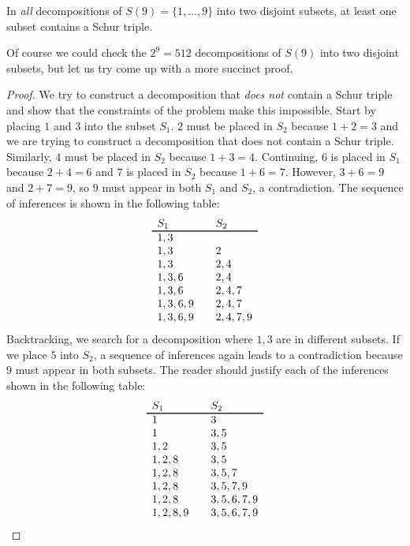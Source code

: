 \begin{theorem}
In \emph{all} decompositions of $S(9)=\{1,\ldots,9\}$ into two disjoint subsets, at least one subset contains a Schur triple.
\end{theorem}
Of course we could check the $2^9=512$ decompositions of $S(9)$ into two disjoint subsets, but let us try come up with a more succinct proof.
\begin{proof}
We try to construct a decomposition that \emph{does not} contain a Schur triple and show that the constraints of the problem make this impossible. Start by placing $1$ and $3$ into the subset $S_1$. $2$ must be placed in $S_2$ because $1+2=3$ and we are trying to construct a decomposition that does not contain a Schur triple. Similarly, $4$ must be placed in $S_2$ because $1+3=4$. Continuing, $6$ is placed in $S_1$ because $2+4=6$ and $7$ is placed in $S_2$ because $1+6=7$. However, $3+6=9$ and $2+7=9$, so $9$ must appear in both $S_1$ and $S_2$, a contradiction. The sequence of inferences is shown in the following table:
\[
\begin{array}{l@{\hspace{2em}}l}
S_1&S_2\\\svhline
1,3 & \\
1,3 & 2\\
1,3 & 2,4\\
1,3,6 & 2,4\\
1,3,6 & 2,4,7\\
1,3,6,9 & 2,4,7\\
1,3,6,9 & 2,4,7,9
\end{array}
\]
Backtracking, we search for a decomposition where $1,3$ are in different subsets. If we place $5$ into $S_2$, a sequence of inferences again leads to a contradiction because $9$ must appear in both subsets. The reader should justify each of the inferences shown in the following table:
\[
\begin{array}{l@{\hspace{2em}}l}
S_1&S_2\\\svhline
1&3\\
1 & 3,5\\
1,2&3,5\\
1,2,8&3,5\\
1,2,8&3,5,7\\
1,2,8&3,5,7,9\\
1,2,8&3,5,6,7,9\\
1,2,8,9&3,5,6,7,9
\end{array}
\]

\newpage


\end{proof}

